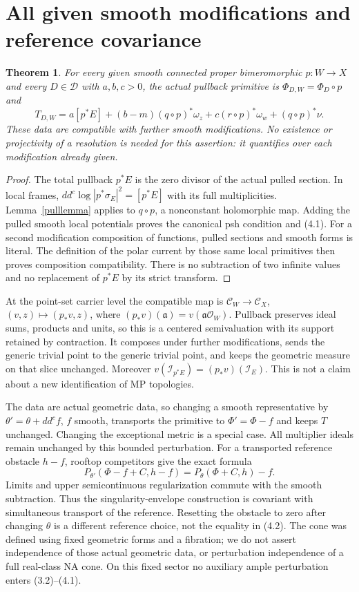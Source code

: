 \documentclass[11pt]{article}
\newtheorem{theorem}{Theorem}[section]
\theoremstyle{remark}\newtheorem{remark}[theorem]{Remark}
\newcommand{\ddc}{dd^c}
\begin{document}
\section{All given smooth modifications and reference covariance}
\begin{theorem}\label{modthm}
For every given smooth connected proper bimeromorphic
$p:W\to X$ and every $D\in\mathscr D$ with $a,b,c>0$,
the actual pullback primitive is $\Phi_{D,W}=\Phi_D\circ p$ and
\[
 T_{D,W}=a[p^*E]+(b-m)(q\circ p)^*\omega_z+
 c(r\circ p)^*\omega_w+(q\circ p)^*\nu.
 \tag{4.1}
\]
These data are compatible with further smooth modifications.
No existence or projectivity of a resolution is needed for this
assertion: it quantifies over each modification already given.
\end{theorem}
\begin{proof}
The total pullback $p^*E$ is the zero divisor of the actual pulled
section. In local frames, $\ddc\log|p^*\sigma_E|^2=[p^*E]$
with its full multiplicities. Lemma~\ref{pulllemma} applies to
$q\circ p$, a nonconstant holomorphic map. Adding the pulled
smooth local potentials proves the canonical psh condition and
(4.1). For a second modification composition of functions,
pulled sections and smooth forms is literal.
The definition of the polar current by those same local primitives
then proves composition compatibility. There is no subtraction of
two infinite values and no replacement of $p^*E$ by its strict transform.
\end{proof}

At the point-set carrier level the compatible map is
$\mathscr C_W\to\mathscr C_X$, $(v,z)\mapsto(p_*v,z)$, where
$(p_*v)(\mathfrak a)=v(\mathfrak a\mathcal O_W)$.
Pullback preserves ideal sums, products and units, so this is a
centered semivaluation with its support retained by contraction.
It composes under further modifications, sends the generic trivial
point to the generic trivial point, and keeps the geometric measure
on that slice unchanged. Moreover
$v(\mathcal I_{p^*E})=(p_*v)(\mathcal I_E)$.
This is not a claim about a new identification of MP topologies.

The data are actual geometric data, so changing a smooth representative
by $\theta'=\theta+\ddc f$, $f$ smooth, transports the primitive
to $\Phi'=\Phi-f$ and keeps $T$ unchanged.
Changing the exceptional metric is a special case.
All multiplier ideals remain unchanged by this bounded perturbation.
For a transported reference obstacle $h-f$, rooftop competitors
give the exact formula
\[
 P_{\theta'}(\Phi-f+C,h-f)=P_\theta(\Phi+C,h)-f.
 \tag{4.2}
\]
Limits and upper semicontinuous regularization commute with the
smooth subtraction. Thus the singularity-envelope construction is
covariant with simultaneous transport of the reference.
Resetting the obstacle to zero after changing $\theta$ is a different
reference choice, not the equality in (4.2).
The cone was defined using fixed geometric forms and a fibration;
we do not assert independence of those actual geometric data,
or perturbation independence of a full real-class NA cone.
On this fixed sector no auxiliary ample perturbation enters (3.2)--(4.1).
\end{document}
